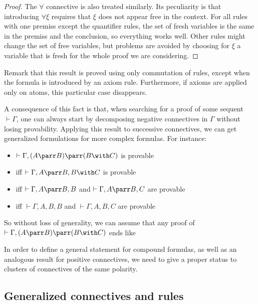 \begin{proof}
The $\forall$ connective is also treated similarly.
Its peculiarity is that introducing $\forall\xi$ requires that $\xi$ does
not appear free in the context.
For all rules with one premiss except the quantifier rules, the set of fresh
variables is the same in the premiss and the conclusion, so everything works
well.
Other rules might change the set of free variables, but problems are avoided
by choosing for $\xi$ a variable that is fresh for the whole proof we are considering.
\end{proof}

Remark that this result is proved using only commutation of rules, except
when the formula is introduced by an axiom rule. Furthermore, if axioms
are applied only on atoms, this particular case disappears.

A consequence of this fact is that, when searching for a proof of some
sequent \(\vdash\Gamma\), one can always start by decomposing negative
connectives in \(\Gamma\) without losing provability. Applying this
result to successive connectives, we can get generalized formulations
for more complex formulas. For instance:
\begin{itemize}
\item
  \(\vdash\Gamma,(A\parr B)\parr(B\with C)\) is provable
\item
  iff \(\vdash\Gamma,A\parr B,B\with C\) is provable
\item
  iff \(\vdash\Gamma,A\parr B,B\) and \(\vdash\Gamma,A\parr B,C\) are
  provable
\item
  iff \(\vdash\Gamma,A,B,B\) and \(\vdash\Gamma,A,B,C\) are provable
\end{itemize}

So without loss of generality, we can assume that any proof of
\(\vdash\Gamma,(A\parr B)\parr(B\with C)\) ends like
\begin{prooftree}
\end{prooftree}

In order to define a general statement for compound formulas, as well as
an analogous result for positive connectives, we need to give a proper
status to clusters of connectives of the same polarity.

\subsection{Generalized connectives and
rules}\label{generalized-connectives-and-rules}


